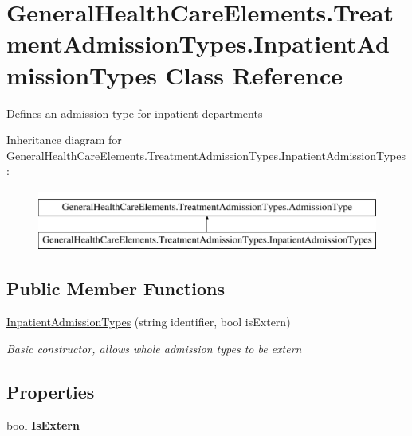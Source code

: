 \hypertarget{class_general_health_care_elements_1_1_treatment_admission_types_1_1_inpatient_admission_types}{}\section{General\+Health\+Care\+Elements.\+Treatment\+Admission\+Types.\+Inpatient\+Admission\+Types Class Reference}
\label{class_general_health_care_elements_1_1_treatment_admission_types_1_1_inpatient_admission_types}


Defines an admission type for inpatient departments  


Inheritance diagram for General\+Health\+Care\+Elements.\+Treatment\+Admission\+Types.\+Inpatient\+Admission\+Types\+:\begin{figure}[H]
\begin{center}
\leavevmode
\includegraphics[height=2.000000cm]{class_general_health_care_elements_1_1_treatment_admission_types_1_1_inpatient_admission_types}
\end{center}
\end{figure}
\subsection*{Public Member Functions}
\begin{DoxyCompactItemize}
\item 
\hyperlink{class_general_health_care_elements_1_1_treatment_admission_types_1_1_inpatient_admission_types_abeeba7d11a2c647e7848f574712564aa}{Inpatient\+Admission\+Types} (string identifier, bool is\+Extern)
\begin{DoxyCompactList}\small\item\em Basic constructor, allows whole admission types to be extern \end{DoxyCompactList}\end{DoxyCompactItemize}
\subsection*{Properties}
\begin{DoxyCompactItemize}
\item 
bool {\bfseries Is\+Extern}\hypertarget{class_general_health_care_elements_1_1_treatment_admission_types_1_1_inpatient_admission_types_adefcb36842686298f6f203032f09d50c}{}\label{class_general_health_care_elements_1_1_treatment_admission_types_1_1_inpatient_admission_types_adefcb36842686298f6f203032f09d50c}

\end{DoxyCompactItemize}


